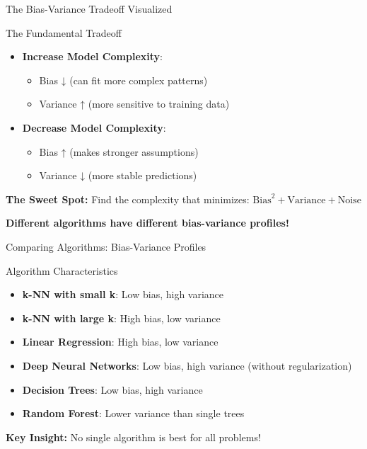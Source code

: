 \documentclass{beamer}
\begin{document}
\begin{frame}{The Bias-Variance Tradeoff Visualized}
\begin{examplebox}{The Fundamental Tradeoff}
\begin{itemize}
\item \textbf{Increase Model Complexity}:
  \begin{itemize}
  \item Bias ↓ (can fit more complex patterns)
  \item Variance ↑ (more sensitive to training data)
  \end{itemize}
\item \textbf{Decrease Model Complexity}:
  \begin{itemize}
  \item Bias ↑ (makes stronger assumptions)
  \item Variance ↓ (more stable predictions)
  \end{itemize}
\end{itemize}
\end{examplebox}

\begin{keypointsbox}
\textbf{The Sweet Spot:}
Find the complexity that minimizes: $\text{Bias}^2 + \text{Variance} + \text{Noise}$
\end{keypointsbox}

\textbf{Different algorithms have different bias-variance profiles!}
\end{frame}

\begin{frame}{Comparing Algorithms: Bias-Variance Profiles}
\begin{definitionbox}{Algorithm Characteristics}
\begin{itemize}
\item \textbf{k-NN with small k}: Low bias, high variance
\item \textbf{k-NN with large k}: High bias, low variance
\item \textbf{Linear Regression}: High bias, low variance
\item \textbf{Deep Neural Networks}: Low bias, high variance (without regularization)
\item \textbf{Decision Trees}: Low bias, high variance
\item \textbf{Random Forest}: Lower variance than single trees
\end{itemize}
\end{definitionbox}

\textbf{Key Insight:} No single algorithm is best for all problems!
\end{frame}
\end{document}
